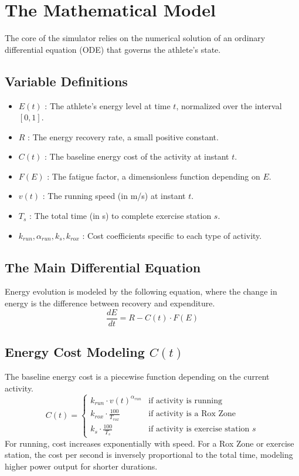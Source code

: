 \documentclass[11pt, a4paper]{article}
\begin{document}
	\section{The Mathematical Model}
	The core of the simulator relies on the numerical solution of an ordinary differential equation (ODE) that governs the athlete's state.
	
	\subsection{Variable Definitions}
	\begin{itemize}
		\item $E(t)$ : The athlete's energy level at time $t$, normalized over the interval $[0, 1]$.
		\item $R$ : The energy recovery rate, a small positive constant.
		\item $C(t)$ : The baseline energy cost of the activity at instant $t$.
		\item $F(E)$ : The fatigue factor, a dimensionless function depending on $E$.
		\item $v(t)$ : The running speed (in m/s) at instant $t$.
		\item $T_s$ : The total time (in s) to complete exercise station $s$.
		\item $k_{run}, \alpha_{run}, k_s, k_{rox}$ : Cost coefficients specific to each type of activity.
	\end{itemize}
	
	\subsection{The Main Differential Equation}
	Energy evolution is modeled by the following equation, where the change in energy is the difference between recovery and expenditure.
	\begin{equation}
		\frac{dE}{dt} = R - C(t) \cdot F(E)
	\end{equation}
	
	\subsection{Energy Cost Modeling $C(t)$}
	The baseline energy cost is a piecewise function depending on the current activity.
	\begin{equation}
		C(t) = 
		\begin{cases} 
			k_{run} \cdot v(t)^{\alpha_{run}} & \text{if activity is running} \\
			k_{rox} \cdot \frac{100}{T_{rox}} & \text{if activity is a Rox Zone} \\
			k_{s} \cdot \frac{100}{T_s} & \text{if activity is exercise station } s
		\end{cases}
	\end{equation}
	For running, cost increases exponentially with speed. For a Rox Zone or exercise station, the cost per second is inversely proportional to the total time, modeling higher power output for shorter durations.
	
\end{document}
